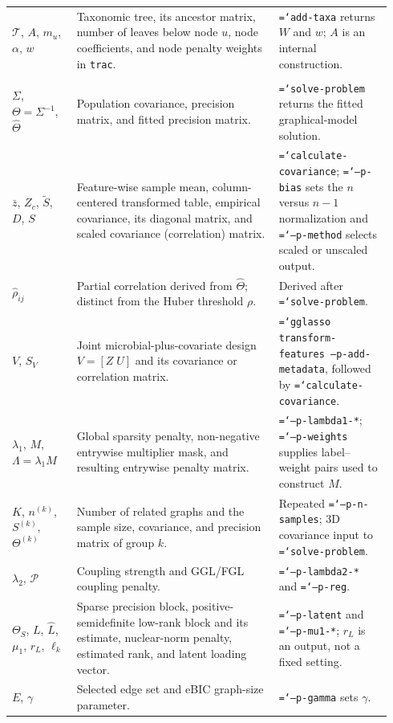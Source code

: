 \documentclass[11pt,a4paper]{article}
\newcommand{\code}[1]{\allowbreak\texttt{\hyphenchar\font=`\-\relax #1}}
\newcommand{\pkg}[1]{\textbf{#1}}
\begin{document}
\begin{longtable}{@{}p{0.16\linewidth}p{0.50\linewidth}p{0.28\linewidth}@{}}
$\mathcal{T}$, $A$, $m_u$, $\alpha$, $w$ & Taxonomic tree, its ancestor matrix, number of leaves below node $u$, node coefficients, and node penalty weights in \texttt{trac}. & \code{add-taxa} returns $W$ and $w$; $A$ is an internal construction. \\
\addlinespace
\multicolumn{3}{@{}l}{\textit{Graphical models (\pkg{q2-gglasso})}} \\
$\Sigma$, $\Theta=\Sigma^{-1}$, $\widehat\Theta$ & Population covariance, precision matrix, and fitted precision matrix. & \code{solve-problem} returns the fitted graphical-model solution. \\
$\bar z$, $Z_c$, $\widetilde S$, $D$, $S$ & Feature-wise sample mean, column-centered transformed table, empirical covariance, its diagonal matrix, and scaled covariance (correlation) matrix. & \code{calculate-covariance}; \code{--p-bias} sets the $n$ versus $n-1$ normalization and \code{--p-method} selects scaled or unscaled output. \\
$\widehat\rho_{ij}$ & Partial correlation derived from $\widehat\Theta$; distinct from the Huber threshold $\rho$. & Derived after \code{solve-problem}. \\
$V$, $S_V$ & Joint microbial-plus-covariate design $V=[Z\;U]$ and its covariance or correlation matrix. & \code{gglasso transform-features --p-add-metadata}, followed by \code{calculate-covariance}. \\
$\lambda_1$, $M$, $\Lambda=\lambda_1 M$ & Global sparsity penalty, non-negative entrywise multiplier mask, and resulting entrywise penalty matrix. & \code{--p-lambda1-*}; \code{--p-weights} supplies label--weight pairs used to construct $M$. \\
$K$, $n^{(k)}$, $S^{(k)}$, $\Theta^{(k)}$ & Number of related graphs and the sample size, covariance, and precision matrix of group $k$. & Repeated \code{--p-n-samples}; 3D covariance input to \code{solve-problem}. \\
$\lambda_2$, $\mathcal P$ & Coupling strength and GGL/FGL coupling penalty. & \code{--p-lambda2-*} and \code{--p-reg}. \\
$\Theta_S$, $L$, $\widehat L$, $\mu_1$, $r_L$, $\ell_k$ & Sparse precision block, positive-semidefinite low-rank block and its estimate, nuclear-norm penalty, estimated rank, and latent loading vector. & \code{--p-latent} and \code{--p-mu1-*}; $r_L$ is an output, not a fixed setting. \\
$E$, $\gamma$ & Selected edge set and eBIC graph-size parameter. & \code{--p-gamma} sets $\gamma$. \\
\bottomrule
\end{longtable}
\end{document}
